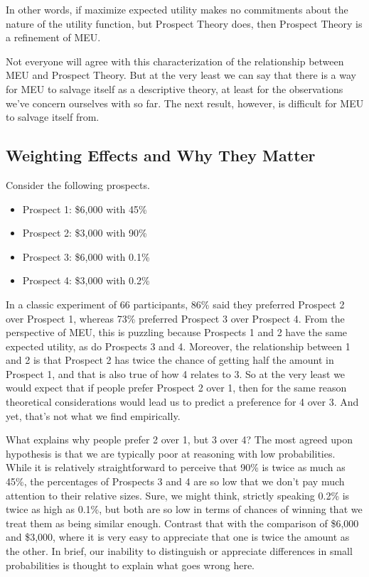 \documentclass[]{tufte-book}
\begin{document}
In other words, if maximize expected utility makes no commitments about the nature of the utility function, but Prospect Theory does, then Prospect Theory is a refinement of MEU.

Not everyone will agree with this characterization of the relationship between MEU and Prospect Theory. But at the very least we can say that there is a way for MEU to salvage itself as a descriptive theory, at least for the observations we've concern ourselves with so far. The next result, however, is difficult for MEU to salvage itself from.

\hypertarget{weighting-effects-and-why-they-matter}{%
\subsection{Weighting Effects and Why They Matter}\label{weighting-effects-and-why-they-matter}}

Consider the following prospects.

\begin{itemize}
\item
  Prospect 1: \$6,000 with 45\%
\item
  Prospect 2: \$3,000 with 90\%
\item
  Prospect 3: \$6,000 with 0.1\%
\item
  Prospect 4: \$3,000 with 0.2\%
\end{itemize}

In a classic experiment of 66 participants, 86\% said they preferred Prospect 2 over Prospect 1, whereas 73\% preferred Prospect 3 over Prospect 4. From the perspective of MEU, this is puzzling because Prospects 1 and 2 have the same expected utility, as do Prospects 3 and 4. Moreover, the relationship between 1 and 2 is that Prospect 2 has twice the chance of getting half the amount in Prospect 1, and that is also true of how 4 relates to 3. So at the very least we would expect that if people prefer Prospect 2 over 1, then for the same reason theoretical considerations would lead us to predict a preference for 4 over 3. And yet, that's not what we find empirically.

What explains why people prefer 2 over 1, but 3 over 4? The most agreed upon hypothesis is that we are typically poor at reasoning with low probabilities. While it is relatively straightforward to perceive that 90\% is twice as much as 45\%, the percentages of Prospects 3 and 4 are so low that we don't pay much attention to their relative sizes. Sure, we might think, strictly speaking 0.2\% is twice as high as 0.1\%, but both are so low in terms of chances of winning that we treat them as being similar enough. Contrast that with the comparison of \$6,000 and \$3,000, where it is very easy to appreciate that one is twice the amount as the other. In brief, our inability to distinguish or appreciate differences in small probabilities is thought to explain what goes wrong here.
\end{document}
